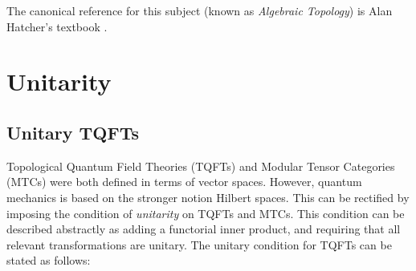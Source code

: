 \documentclass{article}
\theoremstyle{definition}
\numberwithin{figure}{section}
\begin{document}
The canonical reference for this subject (known as \textit{Algebraic Topology}) is Alan Hatcher's textbook \cite{hatcher2005algebraic}.

\section{Unitarity}
\label{Unitarity}

\subsection{Unitary TQFTs}

Topological Quantum Field Theories (TQFTs) and Modular Tensor Categories (MTCs) were both defined in terms of vector spaces. However, quantum mechanics is based on the stronger notion Hilbert spaces. This can be rectified by imposing the condition of \textit{unitarity} on TQFTs and MTCs. This condition can be described abstractly as adding a functorial inner product, and requiring that all relevant transformations are unitary. The unitary condition for TQFTs can be stated as follows:
\end{document}
